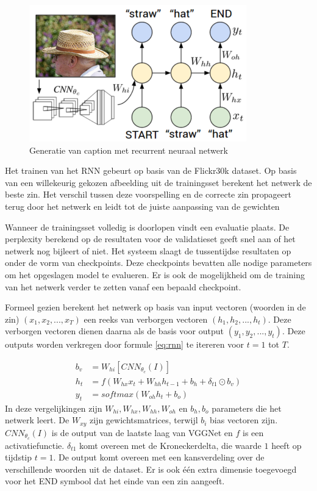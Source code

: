 \begin{figure}[tb]
    \centering
    \includegraphics[width=0.5\linewidth]{Images/karpathy.PNG}
    \caption{Generatie van caption met recurrent neuraal netwerk}
\label{fig:rnntraining}
\end{figure}

Het trainen van het RNN gebeurt op basis van de Flickr30k dataset. 
Op basis van een willekeurig gekozen afbeelding uit de trainingsset berekent het netwerk de beste zin. Het verschil tussen deze voorspelling en de correcte zin propageert terug door het netwerk en leidt tot de juiste aanpassing van de gewichten

Wanneer de trainingsset volledig is doorlopen vindt een evaluatie plaats. De perplexity berekend op de resultaten voor de validatieset geeft snel aan of het netwerk nog bijleert of niet. Het systeem slaagt de tussentijdse resultaten op onder de vorm van checkpoints. Deze checkpoints bevatten alle nodige parameters om het opgeslagen model te evalueren. Er is ook de mogelijkheid om de training van het netwerk verder te zetten vanaf een bepaald checkpoint.

Formeel gezien berekent het netwerk op basis van input vectoren (woorden in de zin) $(x_1,x_2,...,x_T)$ een reeks van verborgen vectoren $(h_1,h_2,...,h_t)$. Deze verborgen vectoren dienen daarna als de basis voor output $(y_1,y_2,...,y_t)$. Deze outputs worden verkregen door formule \eqref{eq:rnn} te itereren voor $t = 1$ tot $T$.

\begin{equation}
\begin{aligned}
     b_v &= W_{hi} [CNN_{\theta_c}(I)] \\
     h_t &= f(W_{hx} x_{t} + W_{hh} h_{t-1} + b_h + \delta_{t1} \odot b_v) \\
     y_t &= softmax( W_{oh} h_t + b_o)
\end{aligned}
\label{eq:rnn}
\end{equation}
In deze vergelijkingen zijn $W_{hi}, W_{hx}, W_{hh}, W_{oh}$ en $b_h, b_o$ parameters die het netwerk leert. De $W_{xy}$ zijn gewichtsmatrices, terwijl $b_i$ bias vectoren zijn. $CNN_{\theta_c}(I)$ is de output van de laatste laag van VGGNet en $f$ is een activatiefunctie. $\delta_{t1}$ komt overeen met de Kroneckerdelta, die waarde $1$ heeft op tijdstip $t=1$. De output komt overeen met een kansverdeling over de verschillende woorden uit de dataset. Er is ook \'e\'en extra dimensie toegevoegd voor het END symbool dat het einde van een zin aangeeft. 

